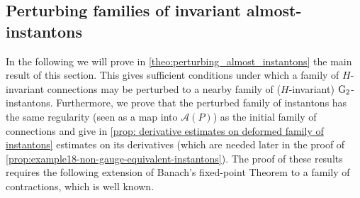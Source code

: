 \documentclass[11pt,a4paper]{scrartcl}
\newcommand{\G}{\textup{G}}
\numberwithin{equation}{section}
\theoremstyle{plain}
\theoremstyle{definition}
\theoremstyle{remark}
\begin{document}
\subsection{Perturbing families of invariant almost-instantons}\label{subsec: perturbing families of connections}

In the following we will prove in \autoref{theo:perturbing_almost_instantons} the main result of this section. This gives sufficient conditions under which a family of $H$-invariant connections may be perturbed to a nearby family of ($H$-invariant) $\G_2$-instantons. Furthermore, we prove that the perturbed family of instantons has the same regularity (seen as a map into $\mathcal{A}(P)$) as the initial family of connections and give in \autoref{prop: derivative estimates on deformed family of instantons} estimates on its derivatives (which are needed later in the proof of \autoref{prop:example18-non-gauge-equivalent-instantons}). The proof of these results requires the following extension of Banach's fixed-point Theorem to a family of contractions, which is well known.
\end{document}
